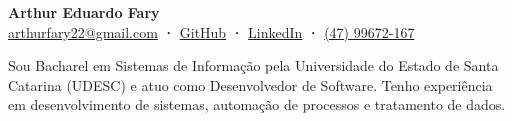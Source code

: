\documentclass{resume}
\begin{document}
\selectfont

\begin{center}
    {\large\textbf{Arthur Eduardo Fary}} \\
    \vspace{0.15em}
    {\small
    \href{mailto:arthurfary22@gmail.com}{arthurfary22@gmail.com}
    \textbf{·}
    \href{https://github.com/arthurfary/}{GitHub}
    \textbf{·}
    \href{https://www.linkedin.com/in/arthur-fary/}{LinkedIn}
    \textbf{·}
    \href{https://wa.me/554799672167}{(47) 99672-167}
    }
\end{center}

\justifying
\small
\parindent 12pt
Sou Bacharel em Sistemas de Informação pela Universidade do Estado de Santa Catarina (UDESC) e atuo como Desenvolvedor de Software. Tenho experiência em desenvolvimento de sistemas, automação de processos e tratamento de dados.
\end{document}
